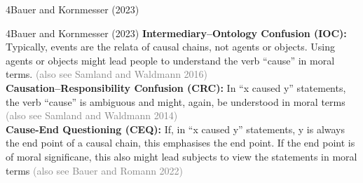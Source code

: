 \documentclass[xcolor=table,9pt,aspectratio=169]{beamer}
\begin{document}
\begin{frame}
\begin{overlayarea}{\textwidth}{0.81\paperheight}{
   \vspace*{11mm}
   \textcolor{uolblue}
   {4\hspace*{1em}Bauer and Kornmesser (2023)}
}
\end{overlayarea}
\end{frame}


\begin{frame}{\vspace*{10mm}4\hspace*{1em}Bauer and Kornmesser (2023)}
\vspace*{-5mm}
\textbf{Intermediary--Ontology Confusion (IOC):} Typically, events are the relata of causal chains, not agents or objects. Using agents or objects might lead people to understand the verb ``cause'' in moral terms. \textcolor{gray}{(also see Samland and Waldmann 2016)}\\
\vspace*{1em}
\textbf{Causation--Responsibility Confusion (CRC):} In ``x caused y'' statements, the verb ``cause'' is ambiguous and might, again, be understood in moral terms \textcolor{gray}{(also see Samland and Waldmann 2014)}\\
\vspace*{1em}
\textbf{Cause-End Questioning (CEQ):} If, in ``x caused y'' statements, y is always the end point of a causal chain, this emphasises the end point. If the end point is of moral significane, this also might lead subjects to view the statements in moral terms \textcolor{gray}{(also see Bauer and Romann 2022)}\\
\end{frame}
\end{document}

